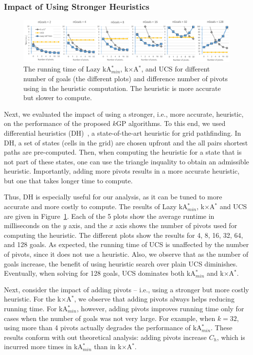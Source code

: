 \documentclass{aicom2e}
\newcommand{\kgs}{$k$GP}
\newcommand{\kastarmin}{kA$^*_{min}$}
\newcommand{\kxastar}{k$\times$A$^*$}
\begin{document}
\subsubsection{Impact of Using Stronger Heuristics}

\begin{figure}
	\includegraphics[width=\textwidth]{heuristic-power_cropped.pdf}
	\caption{The running time of Lazy \kastarmin{}, \kxastar{}, and UCS for different number of goals (the different plots) and difference number of pivots using in the heuristic computation. The heuristic is more accurate but slower to compute.}
	\label{fig:dh-results}
\end{figure}

Next, we evaluated the impact of using a stronger, i.e., more accurate, heuristic, on the performance of the proposed \kgs{} algorithms. To this end, we used differential heuristics (DH)~\cite{who}, a state-of-the-art heuristic for grid pathfinding. In DH, a set of states (cells in the grid) are chosen upfront and the all pairs shortest paths are pre-computed. Then, when computing the heuristic for a state that is not part of these states, 
one can use the triangle inquality to obtain an admissible heuristic. 
Importantly, adding more pivots results in a more accurate heuristic, 
but one that takes longer time to compute. 

Thus, DH is especially useful for our analysis, as it can be tuned to more accurate and more costly to compute. The results of Lazy \kastarmin{}, \kxastar{} and UCS are given in Figure~\ref{fig:dh-results}. Each of the 5 plots show the average runtime in milliseconds on the $y$ axis, and the $x$ axis shows the number of pivots used for computing the heuristic. 
The different plots show the results for 4, 8, 16, 32, 64, and 128 goals. 
As expected, the running time of UCS is unaffected by the number of pivots, since it does not use a heuristic. Also, we observe that as the number of goals increase, the benefit of using heuristic search over plain UCS diminishes. Eventually, when solving for 128 goals, UCS dominates both \kastarmin{} and \kxastar{}. %

Next, consider the impact of adding pivots -- i.e., using a stronger but more costly heuristic. 
For the \kxastar{}, we observe that adding pivots always helps reducing running time. For \kastarmin{}, however, adding pivots improves running time only for cases when the number of goals was not very large. For example, when $k=32$, using more than 4 pivots actually degrades the performance of \kastarmin{}. These results conform with out theoretical analysis: adding pivots increase $C_h$, which is incurred more times in \kastarmin{} than in \kxastar{}. 
\end{document}
